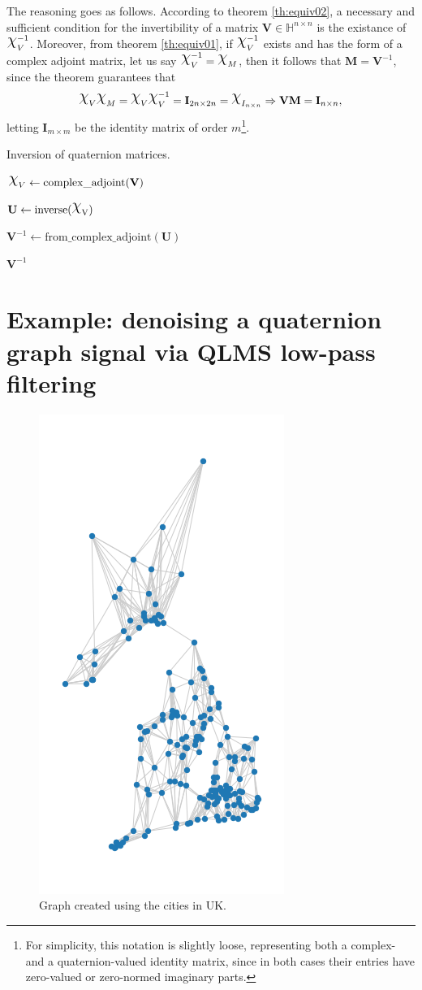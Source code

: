The reasoning goes as follows. According to theorem \ref{th:equiv02}, a necessary and sufficient condition for the invertibility of a matrix $\mathbf{V} \in \mathbb{H}^{n \times n}$ is the existance of $\rchi^{-1}_{V}$. Moreover, from theorem \ref{th:equiv01}, if $\rchi^{-1}_{V}$ exists and has the form of a complex adjoint matrix, let us say $\rchi_{V}^{-1} = \rchi_{M}$, then it follows that $\mathbf{M} = \mathbf{V}^{-1}$, since the theorem guarantees that
\begin{equation}
\rchi_{V} \rchi_{M} = \rchi_{V} \rchi_{V}^{-1} = \mathbf{I}_{2n \times 2n} = \rchi_{I_{n \times n}}
\Rightarrow \mathbf{V} \mathbf{M} = \mathbf{I}_{n \times n},
\end{equation}
letting $\mathbf{I}_{m \times m}$ be the identity matrix of order $m$\footnote{For simplicity, this notation is slightly loose, representing both a complex- and a quaternion-valued identity matrix, since in both cases their entries have zero-valued or zero-normed imaginary parts.}.

\begin{center}
\begin{algorithm}
\caption{Inversion of quaternion matrices.}\label{alg:qinv}
$\rchi_{V} \gets \mathrm{complex\_adjoint(\mathbf{V})}$\;


$\mathbf{U} \gets \mathrm{inverse(\rchi_{V})}$


$\mathbf{V}^{-1} \gets \mathrm{from\_complex\_adjoint}(\mathbf{U})$

\Return $\mathbf{V}^{-1}$
\end{algorithm}
\end{center}

\section{Example: denoising a quaternion graph signal via QLMS low-pass filtering}

\begin{figure}
	\centering
	\includegraphics[width=0.25\linewidth]{thesis/Figures/uk_graph.png}
	\caption{Graph created using the cities in UK.}
	\label{fig:uk_graph}
\end{figure}

